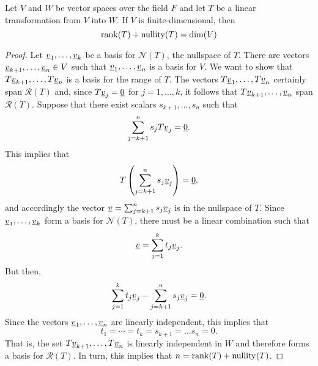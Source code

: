 \begin{theorem}
Let $V$ and $W$ be vector spaces over the field $F$ and let $T$ be a linear transformation from $V$ into $W$.
If $V$ is finite-dimensional, then
\begin{equation*}
\mathrm{rank} (T) + \mathrm{nullity} (T) = \dim (V)
\end{equation*}
\end{theorem}
\begin{proof}
Let $\underline{v}_1, \ldots, \underline{v}_k$ be a basis for $\mathcal{N}(T)$, the nullspace of $T$.
There are vectors $\underline{v}_{k+1}, \ldots, \underline{v}_n \in V$ such that $\underline{v}_1, \ldots, \underline{v}_n$ is a basis for $V$.
We want to show that $T \underline{v}_{k+1}, \ldots, T \underline{v}_n$ is a basis for the range of $T$.
The vectors $T \underline{v}_1, \ldots, T \underline{v}_n$ certainly span $\mathcal{R}(T)$ and, since $T \underline{v}_j = \underline{0}$ for $j = 1, \ldots, k$, it follows that $T \underline{v}_{k+1}, \ldots, \underline{v}_n$ span $\mathcal{R}(T)$.
Suppose that there exist scalars $s_{k+1}, \ldots, s_n$ such that
\begin{equation*}
\sum_{j=k+1}^n s_j T \underline{v}_j = \underline{0}.
\end{equation*}
This implies that
\begin{equation*}
T \left( \sum_{j=k+1}^n s_j \underline{v}_j \right) = \underline{0}.
\end{equation*}
and accordingly the vector $\underline{v} = \sum_{j=k+1}^n s_j \underline{v}_j$ is in the nullspace of $T$.
Since $\underline{v}_1, \ldots, \underline{v}_k$ form a basis for $\mathcal{N}(T)$, there must be a linear combination such that
\begin{equation*}
\underline{v} = \sum_{j=1}^k t_j \underline{v}_j .
\end{equation*}
But then,
\begin{equation*}
\sum_{j=1}^k t_j \underline{v}_j - \sum_{j=k+1}^n s_j \underline{v}_j = \underline{0}.
\end{equation*}
Since the vectors $\underline{v}_1, \ldots, \underline{v}_n$ are linearly independent, this implies that
\begin{equation*}
t_1 = \cdots = t_k = s_{k+1} = \hdots s_n = 0.
\end{equation*}
That is, the set $T \underline{v}_{k+1}, \ldots, T \underline{v}_n$ is linearly independent in $W$ and therefore forms a basis for $\mathcal{R}(T)$.
In turn, this implies that $n = \mathrm{rank}(T) + \mathrm{nullity}(T)$.
\end{proof}

